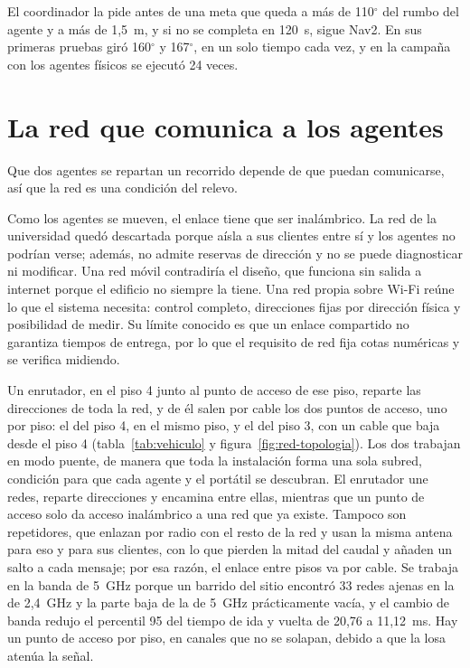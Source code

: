 El coordinador la pide antes de una meta que queda a más de 110$^\circ$ del rumbo del agente y a más de 1,5~m, y si no se completa en 120~s, sigue Nav2. En sus primeras pruebas giró 160$^\circ$ y 167$^\circ$,
en un solo tiempo cada vez, y en la campaña con los agentes físicos se ejecutó 24 veces.

\section{La red que comunica a los agentes}
\label{sec:dos-vehiculos}
\label{sec:red}

Que dos agentes se repartan un recorrido depende de que puedan comunicarse, así que la red es una condición del relevo.

Como los agentes se mueven, el enlace tiene que ser inalámbrico. La red de la universidad quedó descartada porque aísla a sus clientes entre sí y los agentes no podrían verse; además, no
admite reservas de dirección y no se puede diagnosticar ni modificar. Una red móvil contradiría el diseño, que funciona sin salida a internet porque el edificio no siempre la tiene. Una red
propia sobre Wi-Fi reúne lo que el sistema necesita: control completo, direcciones fijas por dirección física y posibilidad de medir. Su límite conocido es que un enlace compartido no garantiza
tiempos de entrega, por lo que el requisito de red fija cotas numéricas y se verifica midiendo.


Un enrutador, en el piso 4 junto al punto de acceso de ese piso, reparte las direcciones de toda la red, y de él salen por cable los dos puntos de acceso, uno por piso: el del piso 4, en el mismo piso, y el del piso 3, con un cable que baja desde el piso 4 (tabla~\ref{tab:vehiculo} y figura~\ref{fig:red-topologia}). Los dos trabajan en modo puente, de manera que toda la instalación forma una sola subred, condición para que cada agente y el portátil se descubran. El enrutador une redes, reparte direcciones y encamina entre ellas, mientras que un
punto de acceso solo da acceso inalámbrico a una red que ya existe. Tampoco son repetidores, que enlazan por radio con el resto de la red y usan la misma antena para eso y para sus clientes, con lo que
pierden la mitad del caudal y añaden un salto a cada mensaje; por esa razón, el enlace entre pisos va por cable. Se trabaja en la banda de 5~GHz porque un barrido del sitio encontró 33 redes ajenas en
la de 2,4~GHz y la parte baja de la de 5~GHz prácticamente vacía, y el cambio de banda redujo el percentil 95 del tiempo de ida y vuelta de 20,76 a 11,12~ms. Hay un punto de acceso por piso, en canales
que no se solapan, debido a que la losa atenúa la señal.

